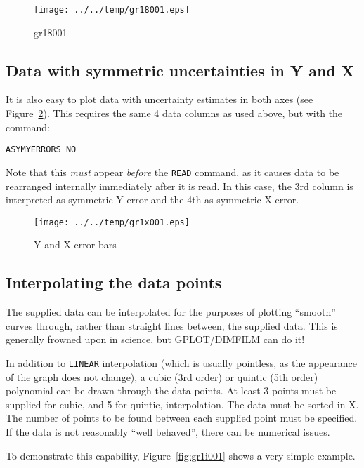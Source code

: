 \documentclass[a4paper,twoside,11pt]{article}
\makeatletter
\def\maxwidth{%
  \ifdim\Gin@nat@width>\linewidth
    \linewidth
  \else
    \Gin@nat@width
  \fi
}
\newcommand{\newpara}{\par\vspace{4mm}\noindent}
\makeatother
\begin{document}
\begin{figure}
  \centering
  \texttt{[image: ../../temp/gr18001.eps]}
  \caption{gr18001}
  \label{fig:gr18001}
\end{figure}


\subsection{Data with symmetric uncertainties in Y and X}\label{data-with-symmetric-uncertainties-in-y-and-x}
\newpara
It is also easy to plot data with uncertainty estimates in both axes
(see Figure~\ref{fig:gr1x001}).
This requires the same 4 data columns as used above, but with the
command:

\begin{lstlisting}
ASYMYERRORS NO
\end{lstlisting}

\newpara
Note that this \emph{must} appear \emph{before} the \texttt{READ}
command, as it causes data to be rearranged internally immediately after
it is read. In this case, the 3rd column is interpreted as symmetric Y
error and the 4th as symmetric X error.

\begin{figure}
  \centering
  \texttt{[image: ../../temp/gr1x001.eps]}
  \caption{Y and X error bars}
  \label{fig:gr1x001}
\end{figure}


\subsection{Interpolating the data points}\label{interpolating-the-data-points}
\newpara
The supplied data can be interpolated for the purposes of plotting
``smooth'' curves through, rather than straight lines between, the
supplied data. This is generally frowned upon in science, but
GPLOT/DIMFILM can do it!

\newpara
In addition to \texttt{LINEAR} interpolation (which is usually
pointless, as the appearance of the graph does not change), a cubic (3rd
order) or quintic (5th order) polynomial can be drawn through the data
points. At least 3 points must be supplied for cubic, and 5 for quintic,
interpolation. The data must be sorted in X. The number of points to be
found between each supplied point must be specified. If the data is not
reasonably ``well behaved'', there can be numerical issues.

\newpara
To demonstrate this capability, Figure~\ref{fig:gr1i001} shows a very simple example.
\end{document}
